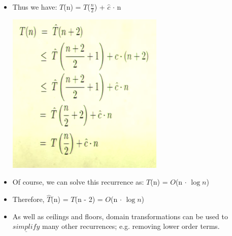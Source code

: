 \documentclass[12pt]{article}
\begin{document}
\begin{itemize}
\begin{itemize}
	\item Thus we have: {\large $T$(n) = $T$(${\frac{n}{2}}$) + $\hat{c}$ $\cdot$ n}
		\begin{center}
		\includegraphics{lecture2l}
		\end{center}
	\item Of course, we can solve this recurrence as: {\large $T$(n) = $O$(n $\cdot$ $\log{}n$)}
	\item Therefore, {\large $\hat{T}$(n) = $T$(n - 2) = $O$(n $\cdot$ $\log{}n$)}
	\item As well as ceilings and floors, domain transformations can be used to 
	$\underline{simplify}$ many other recurrences; e.g. removing lower order terms.
	\end{itemize}
\end{itemize}
\end{document}
